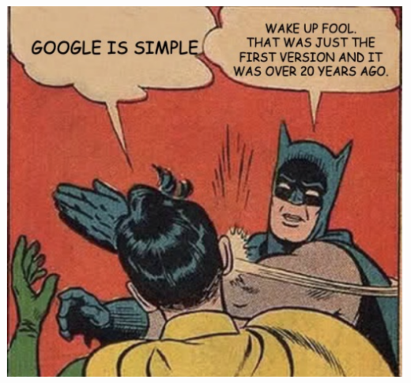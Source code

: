 \documentclass[
10pt, %
aspectratio=169, %
]{beamer}
\begin{document}
	{
		{%
			\includegraphics[width=\paperwidth,height=\paperheight]{meme.png}
		}
		
		\begin{frame}
		\end{frame}
	}
	
\end{document}
